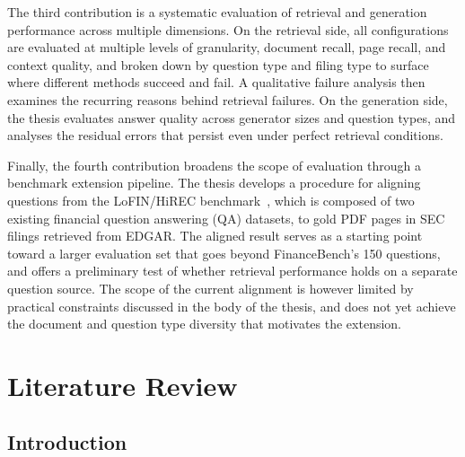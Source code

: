 \documentclass[12pt,twoside,maitrise]{dms}
\theoremstyle{definition}
\numberwithin{equation}{section}
\numberwithin{table}{chapter}
\numberwithin{figure}{chapter}
\begin{document}
The third contribution is a systematic evaluation of retrieval and generation performance
across multiple dimensions. On the retrieval side, all configurations are evaluated at
multiple levels of granularity, document recall, page recall, and context quality, and
broken down by question type and filing type to surface where different methods succeed
and fail. A qualitative failure analysis then examines the recurring reasons behind
retrieval failures. On the generation side,
the thesis evaluates answer quality across generator sizes and question types, and
analyses the residual errors that persist even under perfect retrieval conditions.
 
Finally, the fourth contribution broadens the scope of evaluation through a benchmark extension pipeline. The thesis develops a procedure for aligning questions from the LoFIN/HiREC benchmark~\citep{choe2025hirec}, which is composed of two existing financial question answering (QA) datasets, to gold PDF pages in SEC filings retrieved from EDGAR. The aligned result serves as a starting point toward a larger evaluation set that goes beyond FinanceBench's 150 questions, and offers a preliminary test of whether retrieval performance holds on a separate question source. The scope of the current alignment is however limited by practical constraints discussed in the body of the thesis, and does not yet achieve the document and question type diversity that motivates the extension.




\chapter{Literature Review}
\label{ch:lit}

\section{Introduction}
\end{document}
